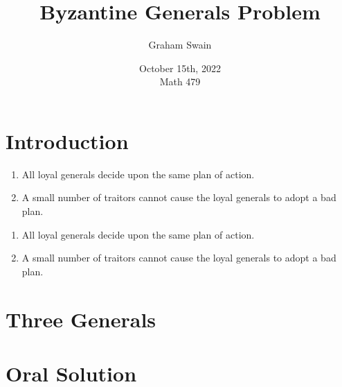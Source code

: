\documentclass{beamer}
\title{Byzantine Generals Problem}
\author[Graham Swain \\ \quad \\ Western Carolina University]{Graham Swain}
\date{October 15th, 2022 \\ Math 479}
\theoremstyle{conjecture1}
\theoremstyle{conjecture2}
\begin{document}
\frame{\titlepage}


\section{Introduction}

\begin{frame}
    \begin{enumerate}[label={\Alph*.}]
        \item All loyal generals decide upon the same plan of action.
        \item A small number of traitors cannot cause the loyal generals to adopt a bad plan.
    \end{enumerate}
\end{frame}

\begin{frame}
    \begin{enumerate}[label={\Alph*.}]
        \item All loyal generals decide upon the same plan of action.
        \item A small number of traitors cannot cause the loyal generals to adopt a bad plan.
    \end{enumerate}
\end{frame}




\section{Three Generals}

\begin{frame}
    
\end{frame}



\section{Oral Solution}
\end{document}
